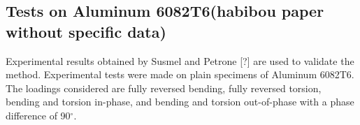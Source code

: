\documentclass[3p,times,number,review]{elsarticle}
\newcommand{\figref}[1]{\figurename~\ref{#1}}
\begin{document}
\subsection{Tests on Aluminum 6082T6(habibou paper without specific data)}
Experimental results obtained by Susmel and Petrone [?] are
used to validate the method. Experimental tests were made on
plain specimens of Aluminum 6082T6. The loadings considered
are fully reversed bending, fully reversed torsion, bending and torsion in-phase, and bending and torsion out-of-phase with a phase
difference of 90$^\circ$.

\end{document}
